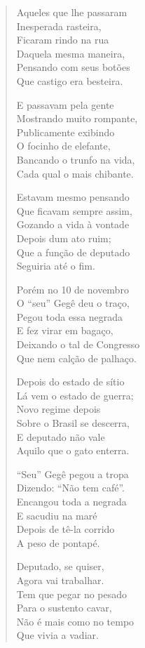 \begin{verse}
Aqueles que lhe passaram\\
Inesperada rasteira,\\
Ficaram rindo na rua\\
Daquela mesma maneira,\\
Pensando com seus botões\\
Que castigo era besteira.
\pagebreak

E passavam pela gente\\
Mostrando muito rompante,\\
Publicamente exibindo\\
O focinho de elefante,\\
Bancando o trunfo na vida,\\
Cada qual o mais chibante. 

Estavam mesmo pensando\\
Que ficavam sempre assim,\\
Gozando a vida à vontade\\
Depois dum ato ruim;\\
Que a função de deputado\\
Seguiria até o fim.

Porém no 10 de novembro\\
O “seu” Gegê deu o traço,\\
Pegou toda essa negrada\\
E fez virar em bagaço,\\
Deixando o tal de Congresso\\
Que nem calção de palhaço.

Depois do estado de sítio\\
Lá vem o estado de guerra;\\
Novo regime depois\\
Sobre o Brasil se descerra,\\
E deputado não vale\\
Aquilo que o gato enterra.
\pagebreak

“Seu” Gegê pegou a tropa\\
Dizendo: “Não tem café”.\\
Encangou toda a negrada\\
E sacudiu na maré\\
Depois de tê-la corrido\\
A peso de pontapé.

Deputado, se quiser,\\
Agora vai trabalhar.\\
Tem que pegar no pesado\\
Para o sustento cavar,\\
Não é mais como no tempo\\
Que vivia a vadiar.


\end{verse}
